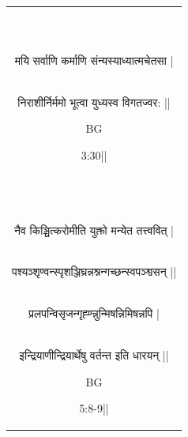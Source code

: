\documentclass[hidelinks,11pt,a4paper]{report}
\begin{document}
\begin{table}[th]
\begin{tabular}{c}
\\
\\\\\\\\\\\\\\\\
\begin{sanskrit}मयि सर्वाणि कर्माणि संन्यस्याध्यात्मचेतसा |\end{sanskrit}\\
\begin{sanskrit}निराशीर्निर्ममो भूत्वा युध्यस्व विगतज्वर: ||\end{sanskrit}BG \begin{sanskrit}3:30||\end{sanskrit}\\
\\\\\\\\\\\\\\\\
\begin{sanskrit}
    नैव किञ्चित्करोमीति युक्तो मन्येत तत्त्ववित् |\end{sanskrit}\\
\begin{sanskrit} पश्यञ्शृण्वन्स्पृशञ्जिघ्रन्नश्नन्गच्छन्स्वपञ्श्वसन् ||\end{sanskrit}\\
\begin{sanskrit}प्रलपन्विसृजन्गृह्ण्न्नुन्मिषन्निमिषन्नपि |\end{sanskrit}\\
\begin{sanskrit}इन्द्रियाणीन्द्रियार्थेषु वर्तन्त इति धारयन् ||\end{sanskrit}BG \begin{sanskrit}5:8-9||\end{sanskrit}\\
    
\end{tabular}
\end{table}

\clearpage

{\small\tableofcontents}



\end{document}
